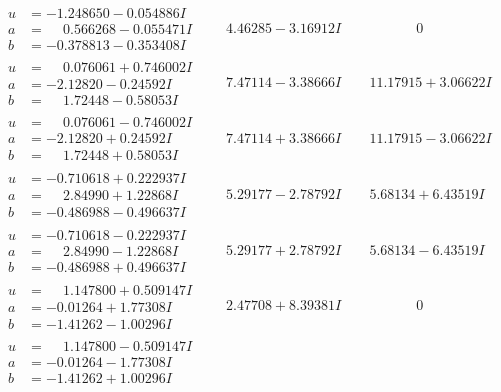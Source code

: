 \documentclass[1p]{elsarticle_modified}
\theoremstyle{definition}
\begin{document}
$$\begin{array}{c|c|c}
\begin{aligned}
u &= -1.248650 - 0.054886 I \\
a &= \phantom{-}0.566268 - 0.055471 I \\
b &= -0.378813 - 0.353408 I\end{aligned}
 & \phantom{-}4.46285 - 3.16912 I & \phantom{-0.000000 } 0 \\ \hline\begin{aligned}
u &= \phantom{-}0.076061 + 0.746002 I \\
a &= -2.12820 - 0.24592 I \\
b &= \phantom{-}1.72448 - 0.58053 I\end{aligned}
 & \phantom{-}7.47114 - 3.38666 I & \phantom{-}11.17915 + 3.06622 I \\ \hline\begin{aligned}
u &= \phantom{-}0.076061 - 0.746002 I \\
a &= -2.12820 + 0.24592 I \\
b &= \phantom{-}1.72448 + 0.58053 I\end{aligned}
 & \phantom{-}7.47114 + 3.38666 I & \phantom{-}11.17915 - 3.06622 I \\ \hline\begin{aligned}
u &= -0.710618 + 0.222937 I \\
a &= \phantom{-}2.84990 + 1.22868 I \\
b &= -0.486988 - 0.496637 I\end{aligned}
 & \phantom{-}5.29177 - 2.78792 I & \phantom{-}5.68134 + 6.43519 I \\ \hline\begin{aligned}
u &= -0.710618 - 0.222937 I \\
a &= \phantom{-}2.84990 - 1.22868 I \\
b &= -0.486988 + 0.496637 I\end{aligned}
 & \phantom{-}5.29177 + 2.78792 I & \phantom{-}5.68134 - 6.43519 I \\ \hline\begin{aligned}
u &= \phantom{-}1.147800 + 0.509147 I \\
a &= -0.01264 + 1.77308 I \\
b &= -1.41262 - 1.00296 I\end{aligned}
 & \phantom{-}2.47708 + 8.39381 I & \phantom{-0.000000 } 0 \\ \hline\begin{aligned}
u &= \phantom{-}1.147800 - 0.509147 I \\
a &= -0.01264 - 1.77308 I \\
b &= -1.41262 + 1.00296 I\end{aligned}

\end{array}$$
\end{document}
